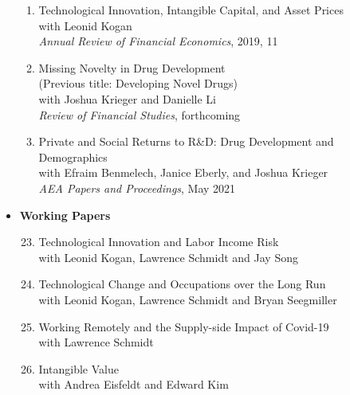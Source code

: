 \documentclass[11pt,letterpaper,serif,overlapped]{res}
\begin{document}
\begin{resume}
\begin{itemize}
\begin{enumerate}
\item Technological Innovation, Intangible Capital, and Asset Prices\\ with Leonid Kogan\\
\emph{Annual Review of Financial Economics}, 2019, 11
\item Missing Novelty in Drug Development\\(Previous title:  Developing Novel Drugs)\\with Joshua Krieger and Danielle Li\\
\emph{Review of Financial Studies}, forthcoming
\item Private and Social Returns to R\&D: Drug Development and Demographics\\
with Efraim Benmelech, Janice Eberly, and Joshua Krieger\\
\emph{AEA Papers and Proceedings}, May 2021

\end{enumerate}
\vspace{0.5cm}
\item \textbf{Working Papers}
\begin{enumerate}
\setcounter{enumi}{22}
\item Technological Innovation and Labor Income Risk\\ with Leonid Kogan, Lawrence Schmidt and Jay Song

\item Technological Change and Occupations over the Long Run \\with Leonid Kogan, Lawrence Schmidt and Bryan Seegmiller

\item Working Remotely and the Supply-side Impact of Covid-19\\
with Lawrence Schmidt

\item Intangible Value\\
with Andrea Eisfeldt and Edward Kim
\end{enumerate}








\end{itemize}
\end{resume}
\end{document}
